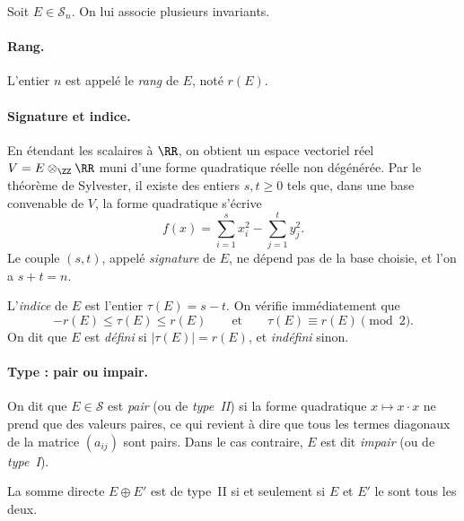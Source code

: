 Soit $E \in \mathcal{S}_n$. On lui associe plusieurs invariants.

\paragraph{Rang.}
L'entier $n$ est appelé le \emph{rang} de $E$, noté $r(E)$.

\paragraph{Signature et indice.}
En étendant les scalaires à $\RR$, on obtient un espace vectoriel réel
$V = E \otimes_\ZZ \RR$ muni d'une forme quadratique réelle non dégénérée. Par le
théorème de Sylvester, il existe des entiers $s, t \geq 0$ tels que, dans une base
convenable de $V$, la forme quadratique s'écrive
\[
  f(x) = \sum_{i=1}^{s} x_i^2 - \sum_{j=1}^{t} y_j^2.
\]
Le couple $(s, t)$, appelé \emph{signature} de $E$, ne dépend pas de la base choisie,
et l'on a $s + t = n$.

\begin{definition}
L'\emph{indice} de $E$ est l'entier $\tau(E) = s - t$. On vérifie immédiatement que
\[
  -r(E) \leq \tau(E) \leq r(E) \qquad \text{et} \qquad \tau(E) \equiv r(E) \pmod{2}.
\]
On dit que $E$ est \emph{défini} si $|\tau(E)| = r(E)$, et \emph{indéfini} sinon.
\end{definition}

\paragraph{Type : pair ou impair.}

\begin{definition}
On dit que $E \in \mathcal{S}$ est \emph{pair} (ou de \emph{type~II}) si la forme
quadratique $x \mapsto x \cdot x$ ne prend que des valeurs paires, ce qui revient à
dire que tous les termes diagonaux de la matrice $(a_{ij})$ sont pairs.
Dans le cas contraire, $E$ est dit \emph{impair} (ou de \emph{type~I}).
\end{definition}

\begin{remark}
La somme directe $E \oplus E'$ est de type~II si et seulement si $E$ et $E'$ le sont
tous les deux.
\end{remark}

